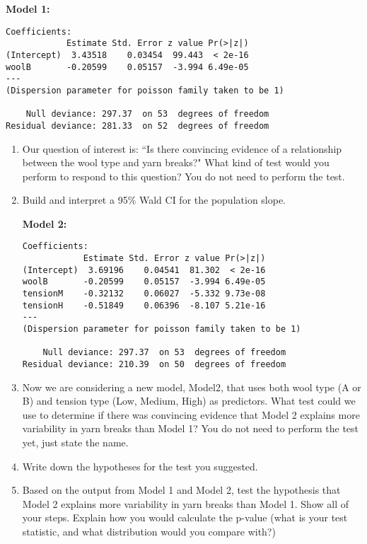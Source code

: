 \documentclass[11pt]{article}
\begin{document}
\textbf{Model 1:} 
{
\begin{verbatim}
Coefficients:
            Estimate Std. Error z value Pr(>|z|)    
(Intercept)  3.43518    0.03454  99.443  < 2e-16 
woolB       -0.20599    0.05157  -3.994 6.49e-05 
---
(Dispersion parameter for poisson family taken to be 1)

    Null deviance: 297.37  on 53  degrees of freedom
Residual deviance: 281.33  on 52  degrees of freedom
\end{verbatim}
}

\begin{enumerate}

\item Our question of interest is: ``Is there convincing evidence of a relationship between the wool type and yarn breaks?" What kind of test would you perform to respond to this question? You do not need to perform the test. 

\vspace{3cm}

\item Build and interpret a 95\% Wald CI for the population slope. 


\vspace{6cm} 


\pagebreak

\textbf{Model 2:} 
{
\begin{verbatim}
Coefficients:
            Estimate Std. Error z value Pr(>|z|)    
(Intercept)  3.69196    0.04541  81.302  < 2e-16 
woolB       -0.20599    0.05157  -3.994 6.49e-05 
tensionM    -0.32132    0.06027  -5.332 9.73e-08 
tensionH    -0.51849    0.06396  -8.107 5.21e-16 
---
(Dispersion parameter for poisson family taken to be 1)

    Null deviance: 297.37  on 53  degrees of freedom
Residual deviance: 210.39  on 50  degrees of freedom
\end{verbatim}
}


\item Now we are considering a new model, Model2, that uses both wool type (A or B) and tension type (Low, Medium, High) as predictors. What test could we use to determine if there was convincing evidence that Model 2 explains more variability in yarn breaks than Model 1? You do not need to perform the test yet, just state the name. 

\vspace{3cm}


\item Write down the hypotheses for the test you suggested. 

\vspace{4cm}

\item Based on the output from Model 1 and Model 2, test the hypothesis that Model 2 explains more variability in yarn breaks than Model 1. Show all of your steps. Explain how you would calculate the p-value (what is your test statistic, and what distribution would you compare with?)


\end{enumerate}
\end{document}
